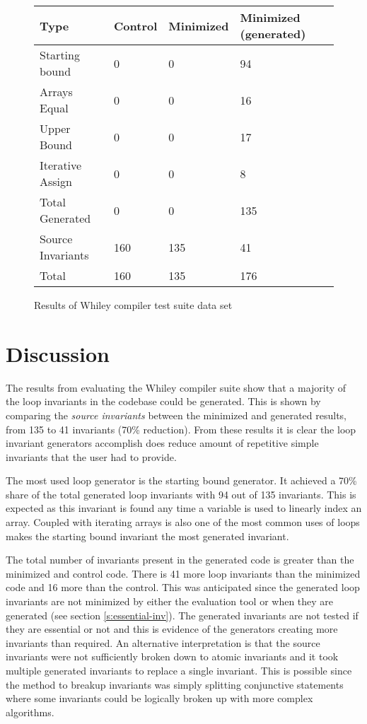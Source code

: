 \begin{figure}[ht]
\begin{center}
\begin{longtable}[]{@{}llll@{}}
\toprule
Type & Control & Minimized & Minimized (generated)\tabularnewline
\midrule
\endhead
Starting bound & 0 & 0 & 94\tabularnewline
Arrays Equal & 0 & 0 & 16\tabularnewline
Upper Bound & 0 & 0 & 17\tabularnewline
Iterative Assign & 0 & 0 & 8\tabularnewline
Total Generated & 0 & 0 & 135\tabularnewline
\hline
Source Invariants & 160 & 135 & 41\tabularnewline
\bottomrule
Total & 160 & 135 & 176\tabularnewline
\end{longtable}

\end{center}
\caption{Results of Whiley compiler test suite data set}
\label{tb:whiley-summary}
\end{figure}

\section{Discussion}

The results from evaluating the Whiley compiler suite show that a majority of
the loop invariants in the codebase could be generated.
This is shown by comparing the \textit{source invariants} between the
minimized and generated results, from 135 to 41 invariants (70\% reduction).
From these results it is clear the loop invariant generators accomplish does
reduce amount of repetitive simple invariants that the user had to provide.

The most used loop generator is the starting bound generator.
It achieved a 70\% share of the total generated loop invariants with 94 out of
135 invariants.
This is expected as this invariant is found any time a variable
is used to linearly index an array.
Coupled with iterating arrays is also one of the most common uses of loops
makes the starting bound invariant the most generated invariant.

The total number of invariants present in the generated code is greater
than the minimized and control code.
There is 41 more loop invariants than the minimized code and 16 more than the control.
This was anticipated since the generated loop invariants are not minimized by either
the evaluation tool or when they are generated (see section \ref{s:essential-inv}).
The generated invariants are not tested if they are essential or not and this is
evidence of the generators creating more invariants than required.
An alternative interpretation is that the source invariants were not sufficiently broken down to
atomic invariants and it took multiple generated invariants to replace a single invariant.
This is possible since the method to breakup invariants was simply splitting conjunctive statements
where some invariants could be logically broken up with more complex algorithms.

